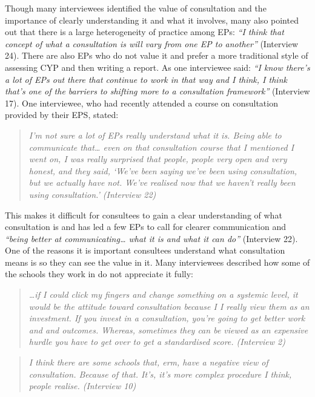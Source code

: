 \documentclass[
]{article}
\begin{document}
Though many interviewees identified the value of consultation and the
importance of clearly understanding it and what it involves, many also
pointed out that there is a large heterogeneity of practice among EPs:
\emph{``I think that concept of what a consultation is will vary from
one EP to another''} (Interview 24). There are also EPs who do not value
it and prefer a more traditional style of assessing CYP and then writing
a report. As one interviewee said: \emph{``I know there's a lot of EPs
out there that continue to work in that way and I think, I think that's
one of the barriers to shifting more to a consultation framework''}
(Interview 17). One interviewee, who had recently attended a course on
consultation provided by their EPS, stated:

\begin{quote}
\emph{I'm not sure a lot of EPs really understand what it is. Being able
to communicate that\ldots{} even on that consultation course that I
mentioned I went on, I was really surprised that people, people very
open and very honest, and they said, `We've been saying we've been using
consultation, but we actually have not. We've realised now that we
haven't really been using consultation.' (Interview 22)}
\end{quote}

This makes it difficult for consultees to gain a clear understanding of
what consultation is and has led a few EPs to call for clearer
communication and \emph{``being better at communicating\ldots{} what it
is and what it can do''} (Interview 22). One of the reasons it is
important consultees understand what consultation means is so they can
see the value in it. Many interviewees described how some of the schools
they work in do not appreciate it fully:

\begin{quote}
\emph{\ldots if I could click my fingers and change something on a
systemic level, it would be the attitude toward consultation because I I
really view them as an investment. If you invest in a consultation,
you're going to get better work and and outcomes. Whereas, sometimes
they can be viewed as an expensive hurdle you have to get over to get a
standardised score. (Interview 2)}
\end{quote}

\begin{quote}
\emph{I think there are some schools that, erm, have a negative view of
consultation. Because of that. It's, it's more complex procedure I
think, people realise. (Interview 10)}
\end{quote}
\end{document}
